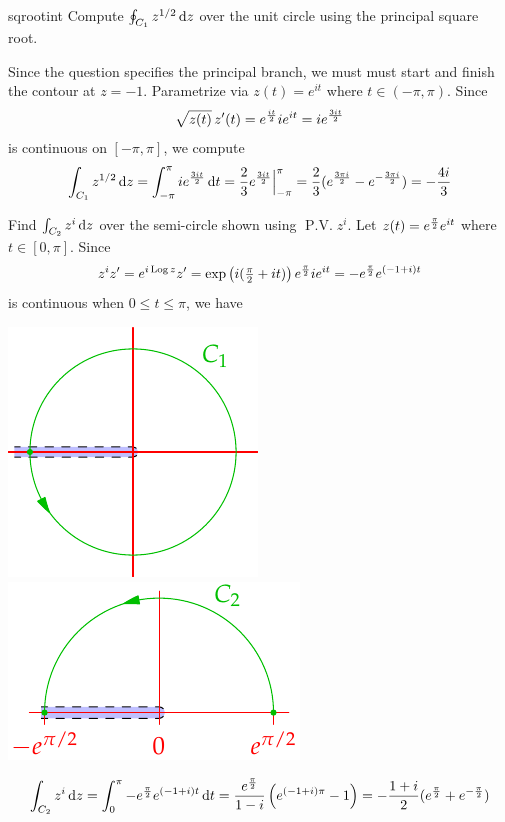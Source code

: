 \begin{examples}{}{sqrootint}
	\exstart Compute $\oint_{C_1}z^{1/2}\,{\mathrm{d} z}$ over the unit circle using the principal square root.
	\begin{enumerate}\setcounter{enumi}{1}
		\begin{minipage}[t]{0.65\linewidth}\vspace{-7pt}
			\item[]Since the question specifies the principal branch, we must must start and finish the contour at $z=-1$. Parametrize via $z(t)=e^{it}$ where $t\in(-\pi,\pi)$. Since
			\[
				\sqrt{z(t)}\,z'(t)=e^{\frac{it}{2}}ie^{it}=ie^{\frac{3it}{2}}
			\]
			is continuous on $[-\pi,\pi]$, we compute
			\[
				\int_{C_1}z^{1/2}\,{\mathrm{d} z}=\int_{-\pi}^\pi ie^{\frac{3it}{2}}\,{\mathrm{d} t} =\frac 23e^{\frac{3it}{2}}\Big|_{-\pi}^{\pi} =\frac 23(e^{\frac{3\pi i}{2}}-e^{-\frac{3\pi i}{2}})=-\frac{4i}3
			\]
		
			\item Find $\int_{C_2}z^i\,{\mathrm{d} z}$ over the semi-circle shown using $\operatorname{P.V.}z^i$.\smallbreak
			Let $z(t)=e^{\frac{\pi}{2}} e^{it}$ where $t\in[0,\pi]$. Since
			\[
				z^iz'=e^{i\operatorname{Log} z}z'=\exp\left(i(\tfrac\pi 2+it)\right)e^{\frac{\pi}{2}}ie^{it}=-e^{\frac{\pi}{2}}e^{(-1+i)t}
			\]
			is continuous when $0\le t\le \pi$, we have
		\end{minipage}
		\hfill
		\begin{minipage}[t]{0.34\linewidth}\vspace{-10pt}
			\flushright\includegraphics{contour-branch2}\bigbreak\medbreak
			\includegraphics{contour-branch3}
		\end{minipage}
		\[
			\int_{C_2}z^i\,{\mathrm{d} z}=\int_0^\pi -e^{\frac{\pi}{2}}e^{(-1+i)t}\,{\mathrm{d} t} =\frac{e^{\frac{\pi}{2}}}{1-i}\left(e^{(-1+i)\pi}-1\right) =-\frac{1+i}{2}(e^{\frac{\pi}{2}}+e^{-\frac{\pi}{2}})
		\]
	\end{enumerate}
\end{examples}


